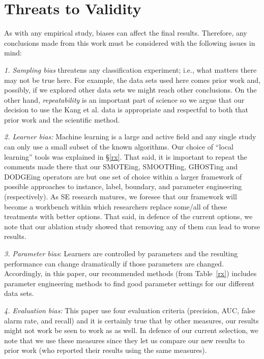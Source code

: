 \section{Threats to Validity}
\label{sec:threats}
 
 
 As with any empirical study, biases can affect the final results. Therefore, any conclusions made from this work must be considered with the following issues in mind: 
 
 {\em 1. Sampling bias } threatens any classification experiment; i.e., what matters there may not be true here. For example, the data sets used here comes prior work
 and, possibly, if we explored other data sets we might reach other conclusions.
On the other hand, {\em repeatability} is an important part of science so we argue
that our decision to use the Kang et al. data is appropriate and respectful to both that prior work
and the scientific method.   
 
 {\em 2. Learner bias:} Machine learning is a large and active field and any single study can only use a small subset of the known  algorithms. Our choice of ``local learning'' tools was explained in \S\ref{rx}. That said, it is important to repeat the comments made there
 that our SMOTEing, SMOOTHing, GHOSTing and DODGEing   operators
 are but one set of  choice within a larger framework of possible approaches to instance, label, boundary, and parameter engineering (respectively).
 As SE research matures, we foresee that our framework will become a workbench   within which researchers replace some/all of these treatments with better options. That said, in defence of the current options, we note that our ablation study showed that removing any of them can lead to worse results. 
 
 
 
 {\em 3. Parameter bias}: Learners are controlled by parameters and the resulting performance can change dramatically if those parameters are changed. Accordingly,
 in this paper, our recommended methods (from Table~\ref{rx}) includes parameter engineering methods to find good parameter settings for our different data sets.  
 
 
 {\em 4. Evaluation bias:} This paper use four evaluation criteria (precision, AUC, false alarm rate, and recall) and it is certainly true that by other measures, our results might not work be seen to work as as well. In defence of our current selection, we note that we use these measures since they let us compare our new results to prior work (who reported their results using the same measures).
 
